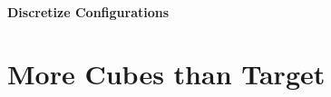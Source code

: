 
\paragraph{Discretize Configurations}





\section{More Cubes than Target}
\label{sec:more_cubes}

